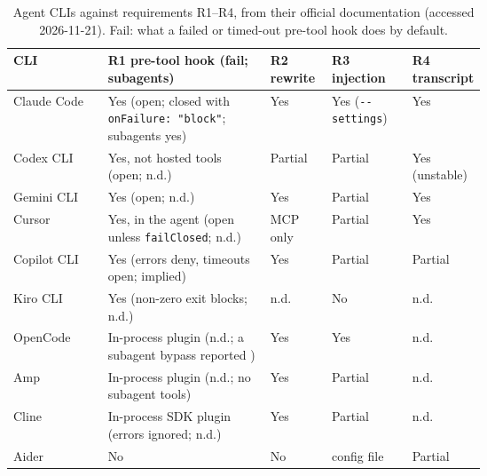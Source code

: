 \begin{table}[!htbp]
\centering\footnotesize
\caption{Agent CLIs against requirements R1--R4, from their official
documentation (accessed 2026-11-21). Fail: what a failed or timed-out
pre-tool hook does by default.}
\label{tab:portability}
\setlength{\tabcolsep}{3pt}
\begin{tabularx}{\linewidth}{@{}>{\raggedright\arraybackslash}p{0.2\linewidth}>{\raggedright\arraybackslash}X>{\raggedright\arraybackslash}p{0.13\linewidth}>{\raggedright\arraybackslash}p{0.17\linewidth}>{\raggedright\arraybackslash}p{0.12\linewidth}@{}}
\toprule
CLI & R1 pre-tool hook (fail; subagents) & R2 rewrite & R3 injection & R4 transcript \\
\midrule
Claude Code \cite{cc-hooks,cc-settings,cc-cli} & Yes (open; closed with \texttt{onFailure: "block"}; subagents yes) & Yes & Yes (\texttt{-{}-settings}) & Yes \\
Codex CLI \cite{codex-hooks,codex-cli} & Yes, not hosted tools (open; n.d.) & Partial & Partial & Yes (unstable) \\
Gemini CLI \cite{gemini-hooks,gemini-hooks-ref,gemini-config} & Yes (open; n.d.) & Yes & Partial & Yes \\
Cursor \cite{cursor-hooks,cursor-cli} & Yes, in the agent (open unless \texttt{failClosed}; n.d.) & MCP only & Partial & Yes \\
Copilot CLI \cite{copilot-hooks} & Yes (errors deny, timeouts open; implied) & Yes & Partial & Partial \\
Kiro CLI \cite{kiro-hooks,kiro-hook-types,kiro-hook-actions} & Yes (non-zero exit blocks; n.d.) & n.d. & No & n.d. \\
OpenCode \cite{opencode-plugins-v1,opencode-plugins-v2,opencode-config-v1} & In-process plugin (n.d.; a subagent bypass reported \cite{opencode-5894}) & Yes & Yes & n.d. \\
Amp \cite{amp-plugin-api,amp-settings,amp-manual} & In-process plugin (n.d.; no subagent tools) & Yes & Partial & n.d. \\
Cline \cite{cline-plugins} & In-process SDK plugin (errors ignored; n.d.) & Yes & Partial & n.d. \\
Aider \cite{aider-options} & No & No & config file & Partial \\
\bottomrule
\end{tabularx}
\end{table}


